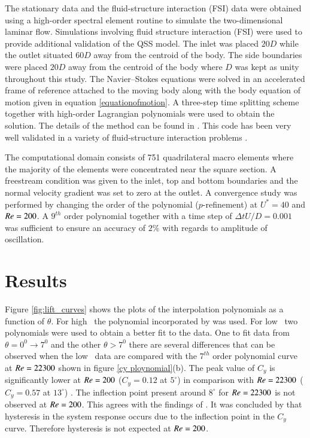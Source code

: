  The stationary data and the fluid-structure interaction (FSI) data were obtained using a high-order spectral element routine to simulate the two-dimensional laminar flow.  Simulations involving fluid structure interaction (FSI) were used to provide additional validation of the QSS model. The inlet was placed $20D$ while the outlet situated $60D$ away from the centroid of the body. The side boundaries were placed $20D$ away from the centroid of the body where $D$ was kept as unity throughout this study. The Navier--Stokes equations were solved in an accelerated frame of reference attached to the moving body along with the body equation of motion given in equation \ref{equationofmotion}. A three-step time splitting scheme together with high-order Lagrangian polynomials were used to obtain the solution. The details of the method can be found in \citet{Thompson2006,Thompson1996a}. This code has been very well validated in a variety of fluid-structure interaction problems \citep{Leontini2007a,Griffith2011,Leontini2011,Leontini2013}.
  
 The computational domain consists of 751 quadrilateral macro elements where the majority of the elements were concentrated near the square section. A freestream condition was given to the inlet, top and bottom boundaries and the normal velocity gradient was set to zero at the outlet. A convergence study was performed by changing the order of the polynomial ($p$-refinement) at $U^*=40$ and $Re=200$. A $9^{th}$ order polynomial together with a time step of $\Delta tU/D=0.001$ was sufficient to ensure an accuracy of $2\%$ with regards to amplitude of oscillation.
 
 
 
 
 \section{Results}
  \label{sec:results}
  
     Figure \ref{fig:lift_curves} shows the plots of the interpolation polynomials as a function of $\theta$. For high \reynoldsnumber \ the polynomial incorporated by \cite{Parkinson1964} was used. For low \reynoldsnumber \ two polynomials were used to obtain a better fit to the data. One to fit data from $\theta=0^0 \rightarrow 7^0$ and the other $\theta > 7^0$ 
   there are several differences that can be observed when the low \reynoldsnumber\ data are compared with the $7^{th}$ order polynomial curve at $Re=22300$ shown in figure \ref{cy ploynomial}(b). The peak value of $C_y$ is  significantly lower at $Re=200$ ($C_y=0.12$ at $5^\circ$) in comparison with $Re=22300$ ($C_y=0.57$ at $13^\circ$) . The inflection point present around $8^\circ$ for $Re=22300$ is not observed at $Re=200$. This agrees with the findings of \cite{Luo2003}.  It was concluded by \cite{Luo2003} that hysteresis in the system response occurs due to the inflection point in the $C_y$ curve. Therefore hysteresis is not expected at $Re=200$.
  
